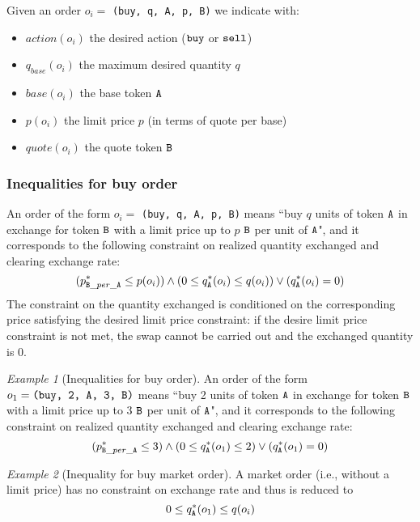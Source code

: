 \documentclass[11pt, reqno]{amsart}
\theoremstyle{definition}
\theoremstyle{remark}
\newtheorem{exmp}{Example}[subsection]
\newcommand{\tA}{\textnormal{\texttt{A}}}
\newcommand{\tB}{\textnormal{\texttt{B}}}
\newcommand{\buy}{\textnormal{\texttt{buy}}}
\newcommand{\sell}{\textnormal{\texttt{sell}}}
\begin{document}
Given an order $o_i =$ \texttt{(\buy, q, \tA, p, \tB)} we indicate with:
\begin{itemize}
	\item $action(o_i)$ the desired action ($\buy$ or $\sell$)
	\item $q_{base}(o_i)$ the maximum desired quantity $q$
	\item $base(o_i)$ the base token $\tA$
	\item $p(o_i)$ the limit price $p$ (in terms of quote per base)
	\item $quote(o_i)$ the quote token $\tB$
\end{itemize}

\subsubsection{Inequalities for buy order}
An order of the form $o_i =$ \texttt{(\buy, q, \tA, p, \tB)} means
``buy $q$ units of token $\tA$ in exchange for token $\tB$ with a limit price
up to $p$ $\tB$ per unit of $\tA$",
and it corresponds to the following constraint on realized quantity exchanged
and clearing exchange rate:
\begin{equation*}
	(p_{\tB\_per\_\tA}^* \leq p(o_i)) \land
	(0 \le q_\tA^*(o_i) \leq q(o_i)) \lor
	(q_\tA^*(o_i) = 0)
\end{equation*}
The constraint on the quantity exchanged is conditioned on the corresponding
price satisfying the desired limit price constraint: if the desire limit price
constraint is not met, the swap cannot be carried out and the exchanged quantity
is 0.

\begin{exmp}[Inequalities for buy order]
An order of the form $o_1 = \texttt{(\buy, 2, \tA, 3, \tB)}$ means
``buy 2 units of token $\tA$ in exchange for token $\tB$ with a limit price up
to 3 $\tB$ per unit of $\tA$",
and it corresponds to the following constraint on realized quantity exchanged
and clearing exchange rate:
\begin{equation*}
    (p_{\tB\_per\_\tA}^* \leq 3) \land
    (0 \le q_\tA^*(o_1) \leq 2) \lor
    (q_\tA^*(o_1) = 0)
\end{equation*}
\end{exmp}

\begin{exmp}[Inequality for buy market order]
A market order (i.e., without a limit price) has no constraint on exchange rate
and thus is reduced to
\[
    0 \le q_\tA^*(o_1) \le q(o_i)
\]
\end{exmp}
\end{document}
